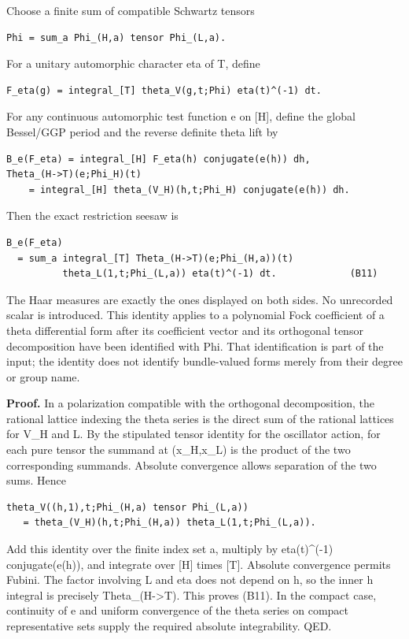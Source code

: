 Choose a finite sum of compatible Schwartz tensors

\begin{verbatim}
Phi = sum_a Phi_(H,a) tensor Phi_(L,a).
\end{verbatim}

For a unitary automorphic character eta of T, define

\begin{verbatim}
F_eta(g) = integral_[T] theta_V(g,t;Phi) eta(t)^(-1) dt.
\end{verbatim}

For any continuous automorphic test function e on {[}H{]}, define the global Bessel/GGP period and the reverse definite theta lift by

\begin{verbatim}
B_e(F_eta) = integral_[H] F_eta(h) conjugate(e(h)) dh,
Theta_(H->T)(e;Phi_H)(t)
    = integral_[H] theta_(V_H)(h,t;Phi_H) conjugate(e(h)) dh.
\end{verbatim}

Then the exact restriction seesaw is

\begin{verbatim}
B_e(F_eta)
  = sum_a integral_[T] Theta_(H->T)(e;Phi_(H,a))(t)
          theta_L(1,t;Phi_(L,a)) eta(t)^(-1) dt.             (B11)
\end{verbatim}

The Haar measures are exactly the ones displayed on both sides. No unrecorded scalar is introduced. This identity applies to a polynomial Fock coefficient of a theta differential form after its coefficient vector and its orthogonal tensor decomposition have been identified with Phi. That identification is part of the input; the identity does not identify bundle-valued forms merely from their degree or group name.

\textbf{Proof.} In a polarization compatible with the orthogonal decomposition, the rational lattice indexing the theta series is the direct sum of the rational lattices for V\_H and L. By the stipulated tensor identity for the oscillator action, for each pure tensor the summand at (x\_H,x\_L) is the product of the two corresponding summands. Absolute convergence allows separation of the two sums. Hence

\begin{verbatim}
theta_V((h,1),t;Phi_(H,a) tensor Phi_(L,a))
   = theta_(V_H)(h,t;Phi_(H,a)) theta_L(1,t;Phi_(L,a)).
\end{verbatim}

Add this identity over the finite index set a, multiply by eta(t)\^{}(-1) conjugate(e(h)), and integrate over {[}H{]} times {[}T{]}. Absolute convergence permits Fubini. The factor involving L and eta does not depend on h, so the inner h integral is precisely Theta\_(H-\textgreater T). This proves (B11). In the compact case, continuity of e and uniform convergence of the theta series on compact representative sets supply the required absolute integrability. QED.

